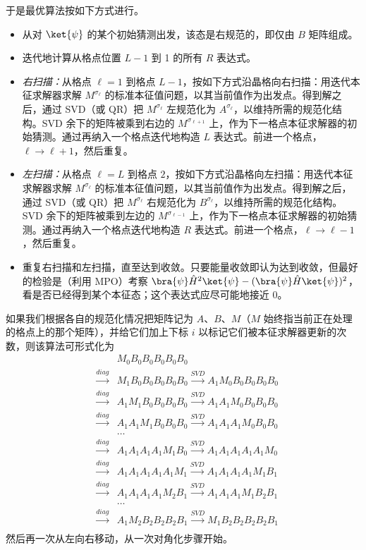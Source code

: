 于是最优算法按如下方式进行。
\begin{itemize}
\item 从对 $\ket{\psi}$ 的某个初始猜测出发，该态是右规范的，即仅由 $B$ 矩阵组成。
\item 迭代地计算从格点位置 $L-1$ 到 1 的所有 $R$ 表达式。
\item {\em 右扫描：}从格点 $\ell=1$ 到格点 $L-1$，按如下方式沿晶格向右扫描：用迭代本征求解器求解 $M^{\sigma_\ell}$ 的标准本征值问题，以其当前值作为出发点。得到解之后，通过 SVD（或 QR）把 $M^{\sigma_\ell}$ 左规范化为 $A^{\sigma_\ell}$，以维持所需的规范化结构。SVD 余下的矩阵被乘到右边的 $M^{\sigma_{\ell+1}}$ 上，作为下一格点本征求解器的初始猜测。通过再纳入一个格点迭代地构造 $L$ 表达式。前进一个格点，$\ell \rightarrow \ell+1$，然后重复。
\item {\em 左扫描：}从格点 $\ell=L$ 到格点 $2$，按如下方式沿晶格向左扫描：用迭代本征求解器求解 $M^{\sigma_\ell}$ 的标准本征值问题，以其当前值作为出发点。得到解之后，通过 SVD（或 QR）把 $M^{\sigma_\ell}$ 右规范化为 $B^{\sigma_\ell}$，以维持所需的规范化结构。SVD 余下的矩阵被乘到左边的 $M^{\sigma_{\ell-1}}$ 上，作为下一格点本征求解器的初始猜测。通过再纳入一个格点迭代地构造 $R$ 表达式。前进一个格点，$\ell \rightarrow \ell-1$，然后重复。
\item 重复右扫描和左扫描，直至达到收敛。只要能量收敛即认为达到收敛，但最好的检验是（利用 MPO）考察
$\bra{\psi} \hat{H}^2 \ket{\psi} - (\bra{\psi} \hat{H} \ket{\psi})^2$，看是否已经得到某个本征态；这个表达式应尽可能地接近 0。
\end{itemize}

如果我们根据各自的规范化情况把矩阵记为 $A$、$B$、$M$（$M$ 始终指当前正在处理的格点上的那个矩阵），并给它们加上下标 $i$ 以标记它们被本征求解器更新的次数，则该算法可形式化为
\begin{eqnarray*}
& & M_0 B_0 B_0 B_0 B_0 B_0 \\
&\stackrel{diag}{\rightarrow}& M_1 B_0 B_0 B_0 B_0 B_0
\stackrel{SVD}{\rightarrow} A_1 M_0 B_0 B_0 B_0 B_0 \\
&\stackrel{diag}{\rightarrow}& A_1 M_1 B_0 B_0 B_0 B_0
\stackrel{SVD}{\rightarrow} A_1 A_1 M_0 B_0 B_0 B_0 \\
&\stackrel{diag}{\rightarrow}& A_1 A_1 M_1 B_0 B_0 B_0
\stackrel{SVD}{\rightarrow} A_1 A_1 A_1 M_0 B_0 B_0 \\
& & \ldots \\
&\stackrel{diag}{\rightarrow}& A_1 A_1 A_1 A_1 M_1 B_0
\stackrel{SVD}{\rightarrow} A_1 A_1 A_1 A_1 A_1 M_0 \\
&\stackrel{diag}{\rightarrow}& A_1 A_1 A_1 A_1 A_1 M_1
\stackrel{SVD}{\rightarrow} A_1 A_1 A_1 A_1 M_1 B_1 \\
&\stackrel{diag}{\rightarrow}& A_1 A_1 A_1 A_1 M_2 B_1
\stackrel{SVD}{\rightarrow} A_1 A_1 A_1 M_1 B_2 B_1 \\
& & \ldots \\
&\stackrel{diag}{\rightarrow}& A_1 M_2 B_2 B_2 B_2 B_1
\stackrel{SVD}{\rightarrow} M_1 B_2 B_2 B_2 B_2 B_1 \\
\end{eqnarray*}
然后再一次从左向右移动，从一次对角化步骤开始。

